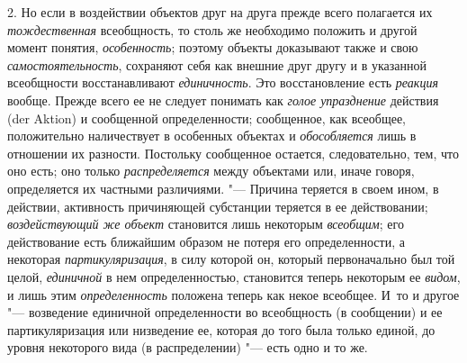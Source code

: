 {{2. Но если в воздействии объектов друг на друга прежде всего
полагается их {\em тождественная}
всеобщность, то столь же необходимо положить и другой момент
понятия, {\em особенность};
поэтому объекты доказывают также и свою
{\em самостоятельность},
сохраняют себя как внешние друг другу и в указанной
всеобщности восстанавливают
{\em единичность}. Это
восстановление есть {\em реакция}
вообще. Прежде всего ее не следует понимать
как {\em голое упразднение}
действия (der Aktion) и сообщенной
определенности; сообщенное, как всеобщее, положительно наличествует в
особенных объектах и {\em обособляется}
лишь в отношении их разности. Постольку сообщенное остается,
следовательно, тем, что оно есть; оно только
{\em распределяется}
между объектами или, иначе говоря, определяется их частными
различиями. "--- Причина теряется в своем ином, в действии,
активность причиняющей субстанции теряется в ее действовании;
{\em воздействующий же объект}
становится лишь некоторым
{\em всеобщим}; его
действование есть ближайшим образом не потеря его определенности, а
некоторая {\em партикуляризация},
в силу которой он, который первоначально был той целой,
{\em единичной} в нем
определенностью, становится теперь некоторым ее
{\em видом}, и лишь этим
{\em определенность}
положена теперь как некое всеобщее. И~то и другое
"--- возведение единичной определенности во всеобщность (в
сообщении) и ее партикуляризация или низведение ее, которая до того была
только единой, до уровня некоторого вида (в распределении)
"--- есть одно и то
же.

}}
